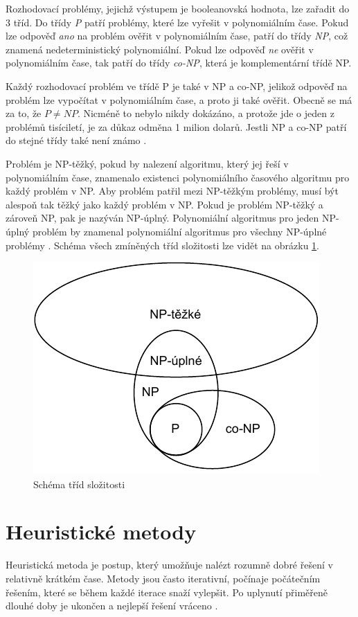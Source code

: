 Rozhodovací problémy, jejichž výstupem je booleanovská hodnota, lze zařadit do 3 tříd.
Do třídy \textit{P} patří problémy, které lze vyřešit v polynomiálním čase.
Pokud lze odpověď \textit{ano} na problém ověřit v polynomiálním čase, patří do třídy \textit{NP}, což znamená nedeterministický polynomiální.
Pokud lze odpověď \textit{ne} ověřit v polynomiálním čase, tak patří do třídy \textit{co-NP}, která je komplementární třídě NP.

Každý rozhodovací problém ve třídě P je také v NP a co-NP, jelikož odpověď na problém lze vypočítat v polynomiálním čase, a proto ji také ověřit.
Obecně se má za to, že $P\neq NP$.
Nicméně to nebylo nikdy dokázáno, a protože jde o jeden z problémů tisíciletí, je za důkaz odměna 1 milion dolarů.
Jestli NP a co-NP patří do stejné třídy také není známo \cite{erickson}.

Problém je NP-těžký, pokud by nalezení algoritmu, který jej řeší v polynomiálním čase, znamenalo existenci polynomiálního časového algoritmu pro každý problém v NP.
Aby problém patřil mezi NP-těžkým problémy, musí být alespoň tak těžký jako každý problém v NP.
Pokud je problém NP-těžký a zároveň NP, pak je nazýván NP-úplný.
Polynomiální algoritmus pro jeden NP-úplný problém by znamenal polynomiální algoritmus pro všechny NP-úplné problémy \cite{erickson}.
Schéma všech zmíněných tříd složitosti lze vidět na obrázku \ref{fig:complexity-classes}.

\begin{figure}[htbp]
\centerline{\includegraphics[scale=0.7]{img/complexity-classes.pdf}}
\caption{Schéma tříd složitosti}
\label{fig:complexity-classes}
\end{figure}

\section{Heuristické metody}
Heuristická metoda je postup, který umožňuje nalézt rozumně dobré řešení v relativně krátkém čase.
Metody jsou často iterativní, počínaje počátečním řešením, které se během každé iterace snaží vylepšit.
Po uplynutí přiměřeně dlouhé doby je ukončen a nejlepší řešení vráceno \cite{kaveh}.

